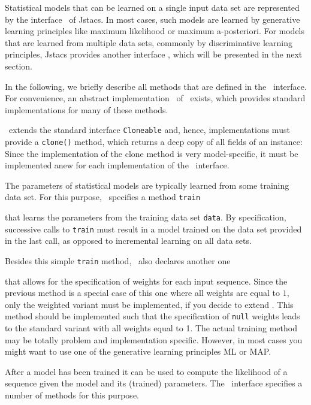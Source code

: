 
Statistical models that can be learned on a single input data set are represented by the interface \TrainSM~of Jstacs. In most cases, such models are learned by generative learning principles like maximum likelihood or maximum a-posteriori. For models that are learned from multiple data sets, commonly by discriminative learning principles, Jstacs provides another interface \DiffSM, which will be presented in the next section.

In the following, we briefly describe all methods that are defined in the \TrainSM~interface. For convenience, an abstract implementation \AbstractTrainSM~of \TrainSM~exists, which provides standard implementations for many of these methods.

\renewcommand{\codefile}{../../de/jstacs/sequenceScores/SequenceScore.java}
\setcounter{off}{45}


\TrainSM~extends the standard interface \lstinline+Cloneable+ and, hence, implementations must provide a \lstinline+clone()+ method, which returns a deep copy of all fields of an instance:
Since the implementation of the clone method is very model-specific, it must be implemented anew for each implementation of the \TrainSM~interface.

The parameters of statistical models are typically learned from some training data set. For this purpose, \TrainSM~specifies a method \lstinline+train+
\addtocounter{off}{18}
that learns the parameters from the training data set \lstinline+data+. By specification, successive calls to \lstinline+train+ must result in a model trained on the data set provided in the last call, as opposed to incremental learning on all data sets.

Besides this simple \lstinline+train+ method, \TrainSM~also declares another one
\addtocounter{off}{27}
that allows for the specification of weights for each input sequence. Since the previous method is a special case of this one where all weights are equal to $1$, only the weighted variant must be implemented, if you decide to extend \AbstractTrainSM. This method should be implemented such that the specification of \lstinline+null+ weights leads to the standard variant with all weights equal to 1. The actual training method may be totally problem and implementation specific. However, in most cases you might want to use one of the generative learning principles ML or MAP.

After a model has been trained it can be used to compute the likelihood of a sequence given the model and its (trained) parameters. The \TrainSM~interface specifies a number of methods for this purpose.

